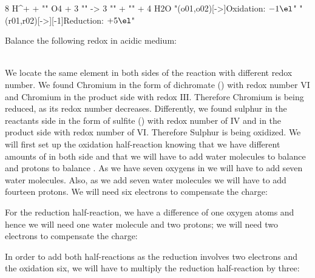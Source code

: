 \documentclass[main.tex]{subfiles} %
\begin{document}
\begin{description}
\vspace{0.5cm}
 \begin{reaction*}
  8 H^+\aq{} + "" O4 \aq{} + 3 "" \aq{} 
    ->
  3 "" \aq{} +  "" \aq{} + 4 H2O\lqd{}
  "\redox(o01,o02)[->]{\small Oxidation: $- 1\el$}"
  "\redox(r01,r02)[->][-1]{\small Reduction: $+ 5\el$}"
\end{reaction*}\vspace{0.5cm}
\begin{example} %
Balance the following redox in acidic medium:
\begin{center}\end{center}
\\
We locate the same element in both sides of the reaction with different redox number. We found Chromium in the form of dichromate () with redox number $\text{VI}$ and Chromium in the product side with redox $\text{III}$. Therefore Chromium is being reduced, as its redox number decreases. Differently, we found sulphur in the reactants side in the form of sulfite () with redox number of $\text{IV}$ and in the product side with redox number of $\text{VI}$. Therefore Sulphur is being oxidized. We will first set up the oxidation half-reaction knowing that we have different amounts of  in both side and that we will have to add water molecules to balance  and protons to balance  . As we have seven oxygens in  we will have to add seven water molecules. Also, as we add seven water molecules we will have to add fourteen protons. We will need six electrons to compensate the charge:
\begin{center}\end{center}
For the reduction half-reaction, we have a difference of one oxygen atoms and hence we will need one water molecule and two protons; we will need two electrons to compensate the charge:
\begin{center}\end{center}
In order to add both half-reactions as the reduction involves two electrons and the oxidation six, we will have to multiply the reduction half-reaction by three:
 \begin{center}

\end{center}
\end{example}
\end{description}
\end{document}
